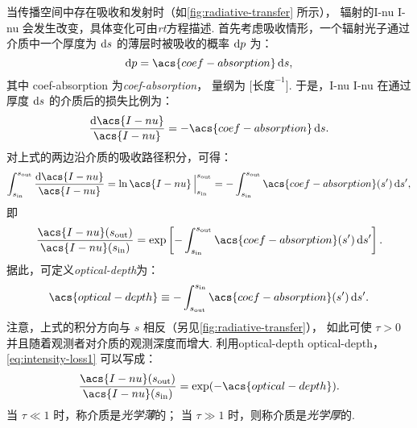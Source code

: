 当传播空间中存在吸收和发射时（如\autoref{fig:radiative-transfer} 所示），
辐射的\acl{I-nu} \acs{I-nu} 会发生改变，具体变化可由\emph{\acf{rt}}方程描述.
首先考虑吸收情形，一个辐射光子通过介质中一个厚度为 $\mathrm{d}s$ 的薄层时被吸收的概率 $\mathrm{d}p$ 为：
\begin{equation}
  \D{p} = \acs{coef-absorption} \,\D{s} ,
\end{equation}
其中 \acs{coef-absorption} 为\emph{\acl{coef-absorption}}，
量纲为 $\big[\text{长度}^{-1}\big]$.
于是，\acl{I-nu} \acs{I-nu} 在通过厚度 $\mathrm{d}s$ 的介质后的损失比例为：
\begin{equation}
  \label{eq:rt-absorption}
  \frac{\D{\acs{I-nu}}}{\acs{I-nu}} = - \acs{coef-absorption} \,\D{s} .
\end{equation}
对上式的两边沿介质的吸收路径积分，可得：
\begin{equation}
  \int_{s_{\R{in}}}^{s_{\R{out}}} \frac{\D{\acs{I-nu}}}{\acs{I-nu}}
    = \ln\acs{I-nu} \,\Big|_{s_{\R{in}}}^{s_{\R{out}}}
    = - \int_{s_{\R{in}}}^{s_{\R{out}}} \acs{coef-absorption}(s') \,\D{s'} ,
\end{equation}
即
\begin{equation}
  \label{eq:intensity-loss1}
  \frac{\acs{I-nu}(s_{\R{out}})}{\acs{I-nu}(s_{\R{in}})} =
    \exp \left[ - \int_{s_{\R{in}}}^{s_{\R{out}}}
      \acs{coef-absorption}(s') \,\D{s'} \right] .
\end{equation}
据此，可定义\emph{\acf{optical-depth}}为：
\begin{equation}
  \label{eq:optical-depth}
  \acs{optical-depth} \equiv
    - \int_{s_{\R{out}}}^{s_{\R{in}}} \acs{coef-absorption}(s') \,\D{s'} .
\end{equation}
注意，上式的积分方向与 $s$ 相反（另见\autoref{fig:radiative-transfer}），
如此可使 $\tau > 0$ 并且随着观测者对介质的观测深度而增大.
利用\acl{optical-depth} \acs{optical-depth}，
\autoref{eq:intensity-loss1} 可以写成：
\begin{equation}
  \label{eq:intensity-loss}
  \frac{\acs{I-nu}(s_{\R{out}})}{\acs{I-nu}(s_{\R{in}})} =
    \exp (-\acs{optical-depth}) .
\end{equation}
当 $\tau \ll 1$ 时，称介质是\emph{光学薄}的；
当 $\tau \gg 1$ 时，则称介质是\emph{光学厚}的.

